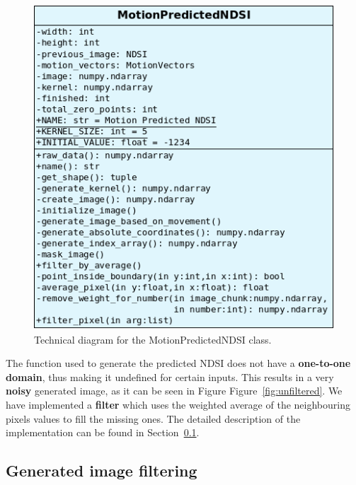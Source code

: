 \documentclass[12pt, a4paper]{report}
\begin{document}
	\begin{figure}[h!]
		\centering
		\includegraphics[scale=0.6]{../images/motion_created_diagram.png}
		\caption{Technical diagram for the MotionPredictedNDSI class.}
		\label{fig:motion_predicted_diagram}
	\end{figure}

	\par The function used to generate the predicted NDSI does not have a \textbf{one-to-one domain}, thus making it undefined for certain inputs. This results in a very \textbf{noisy} generated image, as it can be seen in Figure Figure~\ref{fig:unfiltered}. We have implemented a \textbf{filter} which uses the weighted average of the neighbouring pixels values to fill the missing ones. The detailed description of the implementation can be found in Section~\ref{seq:filter}.
	
	\subsection{Generated image filtering}
	\label{seq:filter}
	
\end{document}
